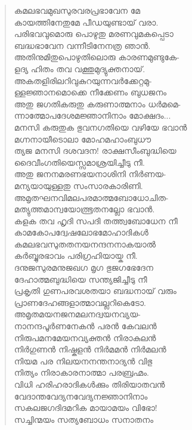 \begin{verse}
കമലഭവമുഖസുരവരപ്രഭാവേന മേ\\
കായത്തിനേതുമേ പീഡയുണ്ടായ് വരാ.\\
പരിഭവവുമൊരു പൊഴുതു മരണവുമകപ്പെടാ\\
ബദ്ധഭാവേന വന്നീടിനേനത്ര ഞാന്‍.\\
അതിനുമിതുപൊഴുതിലൊരു കാരണമുണ്ടുകേ-\\
ളദ്യ ഹിതം തവ വക്തുമുദ്യുക്തനായ്.\\
അകതളിരിലറിവുകുറയുന്നവര്‍ക്കേറ്റമു-\\
ള്ളജ്ഞാനമൊക്കെ നീക്കേണം ബുധജനം\\
അതു ജഗതികരുതു കരുണാത്മനാം ധര്‍മമെ-\\
ന്നാത്മോപദേശമജ്ഞാനിനാം മോക്ഷദം...\\
മനസി കരുതുക ഭുവനഗതിയെ വഴിയേ ഭവാന്‍\\
മഗ്നനായീടൊലാ മോഹമഹാംബുധൗ\\
ത്യജ മനസി ദശവദന! രാക്ഷസീംബുദ്ധിയെ\\
ദൈവീംഗതിയെസ്സമാശ്രയിച്ചീടു നീ.\\
അതു ജനനമരണഭയനാശിനി നിര്‍ണയ-\\
മന്യയായുള്ളതു സംസാരകാരിണി.\\
അമൃതഘനവിമലപരമാത്മബോധോചിത-\\
മത്യുത്തമാന്വയോത്ഭൂതനല്ലോ ഭവാന്‍.\\
കളക തവ ഹൃദി സപദി തത്ത്വബോധേന നീ\\
കാമകോപദ്വേഷലോഭമോഹാദികള്‍\\
കമലഭവസുതതനയനന്ദനനാകയാല്‍\\
കര്‍ബ്ബുരഭാവം പരിഗ്രഹിയായ്ക നീ.\\
ദനുജസുരമനുജഖഗ മൃഗ ഭുജഗഭേദേന\\
ദേഹാത്മബുദ്ധിയെ സന്ത്യജിച്ചീടു നീ\\
പ്രകൃതി ഗുണപരവശതയാ ബദ്ധനായ് വരും\\
പ്രാണദേഹങ്ങളാത്മാവല്ലറികെടോ.\\
അമൃതമയനജനമലനദ്വയനവ്യയ-\\
നാനന്ദപൂര്‍ണനേകന്‍ പരന്‍ കേവലന്‍\\
നിരുപമനമേയനവ്യക്തന്‍ നിരാകുലന്‍\\
നിര്‍ഗുണന്‍ നിഷ്കളന്‍ നിര്‍മമന്‍ നിര്‍മലന്‍\\
നിയമ പര നിലയനനന്തനാദ്യന്‍ വിഭു\\
നിത്യം നിരാകാരനാത്മാ പരബ്രഹ്മം.\\
വിധി ഹരിഹരാദികള്‍ക്കും തിരിയാതവന്‍\\
വേദാന്തവേദ്യനവേദ്യനജ്ഞാനിനാം\\
സകലജഗദിദമറിക മായാമയം വിഭോ!\\
സച്ചിന്മയം സത്യബോധം സനാതനം\\

\end{verse}
